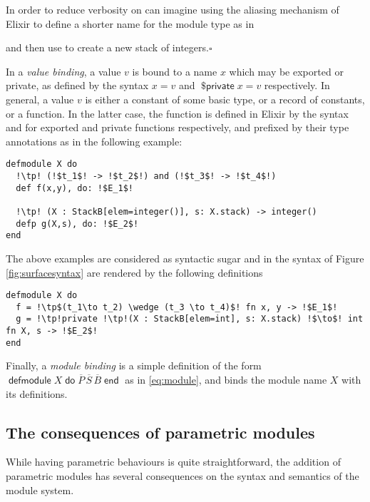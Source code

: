 \documentclass[a4paper,10pt]{article}
\DeclareMathOperator{\kwend}{\textsf{end}}
\DeclareMathOperator{\kwdo}{\textsf{do}}
\DeclareMathOperator{\kwdefm}{\textsf{defmodule}}
\DeclareMathOperator{\kwpr}{\textsf{\$private}}
\begin{document}
\begin{remark} In order to reduce verbosity on can imagine using the aliasing mechanism of Elixir to define a shorter name for the module type  as in


\noindent
and then use  to create a new stack of integers.\hfill$\square$
\end{remark}

In a \emph{value binding}, a value $v$ is bound to a name $x$ which may be exported or private, as defined by the syntax $x = v$ and $\kwpr x = v$ respectively. In general, a value $v$ is either a constant of some basic type, or a record of constants, or a function. In the latter case, the function is defined in Elixir by the syntax  and  for exported and private functions respectively, and prefixed by their type annotations as in the following example:
\begin{verbatim}
defmodule X do
  !\tp! (!$t_1$! -> !$t_2$!) and (!$t_3$! -> !$t_4$!)
  def f(x,y), do: !$E_1$! 

  !\tp! (X : StackB[elem=integer()], s: X.stack) -> integer()
  defp g(X,s), do: !$E_2$!
end  
\end{verbatim}
The above examples are considered as syntactic sugar and in the syntax of Figure \ref{fig:surfacesyntax} are rendered by the following definitions 
\begin{verbatim}
defmodule X do
  f = !\tp$(t_1\to t_2) \wedge (t_3 \to t_4)$! fn x, y -> !$E_1$!
  g = !\tp!private !\tp!(X : StackB[elem=int], s: X.stack) !$\to$! int fn X, s -> !$E_2$!
end
\end{verbatim}

Finally, a \emph{module binding} is a simple definition of the form $\kwdefm X \kwdo \overline{P}\, \overline{S}\, \overline{B} \kwend$  as in \eqref{eq:module}, and binds the module name $X$ with its definitions.


\subsection{The consequences of parametric modules}
While having parametric behaviours is quite straightforward, the addition of parametric modules has several consequences on the syntax and semantics of the module system.
\end{document}
